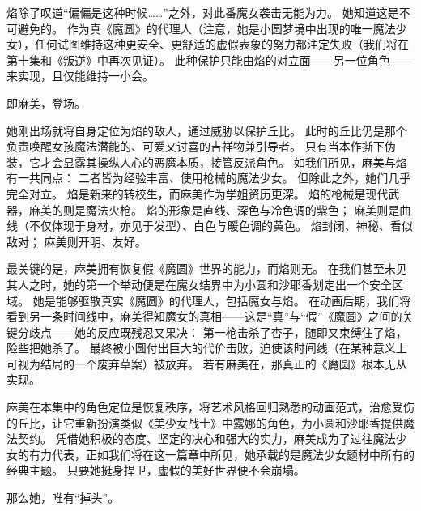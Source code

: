 焰除了叹道“偏偏是这种时候……”之外，对此番魔女袭击无能为力。
她知道这是不可避免的。
作为真《魔圆》的代理人（注意，她是小圆梦境中出现的唯一魔法少女），任何试图维持这种更安全、更舒适的虚假表象的努力都注定失败（我们将在第十集和《叛逆》中再次见证）。
此种保护只能由焰的对立面——另一位角色——来实现，且仅能维持一小会。

即麻美，登场。

她刚出场就将自身定位为焰的敌人，通过威胁以保护丘比。
此时的丘比仍是那个负责唤醒女孩魔法潜能的、可爱又讨喜的吉祥物兼引导者。
只有当本作撕下伪装，它才会显露其操纵人心的恶魔本质，接管反派角色。
如我们所见，麻美与焰有一共同点：
二者皆为经验丰富、使用枪械的魔法少女。
但除此之外，她们几乎完全对立。
焰是新来的转校生，而麻美作为学姐资历更深。
焰的枪械是现代武器，麻美的则是魔法火枪。
焰的形象是直线、深色与冷色调的紫色；
麻美则是曲线（不仅体现于身材，亦见于发型）、白色与暖色调的黄色。
焰封闭、神秘、看似敌对；
麻美则开明、友好。

最关键的是，麻美拥有恢复假《魔圆》世界的能力，而焰则无。
在我们甚至未见其人之时，她的第一个举动便是在魔女结界中为小圆和沙耶香划定出一个安全区域。
她是能够驱散真实《魔圆》的代理人，包括魔女与焰。
在动画后期，我们将看到另一条时间线中，麻美得知魔女的真相——这是“真”与“假”《魔圆》之间的关键分歧点——她的反应既残忍又果决：
第一枪击杀了杏子，随即又束缚住了焰，险些把她杀了。
最终被小圆付出巨大的代价击败，迫使该时间线（在某种意义上可视为结局的一个废弃草案）被放弃。
若有麻美在，那真正的《魔圆》根本无从实现。

麻美在本集中的角色定位是恢复秩序，将艺术风格回归熟悉的动画范式，治愈受伤的丘比，让它重新扮演类似《美少女战士》中露娜的角色，为小圆和沙耶香提供魔法契约。
凭借她积极的态度、坚定的决心和强大的实力，麻美成为了过往魔法少女的有力代表，正如我们将在这一篇章中所见，她承载的是魔法少女题材中所有的经典主题。
只要她挺身捍卫，虚假的美好世界便不会崩塌。

那么她，唯有“掉头”。
